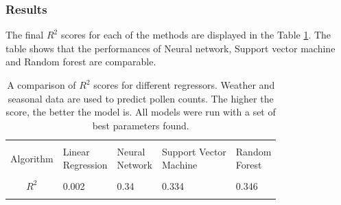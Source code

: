 \documentclass[a4paper,11pt]{article}
\begin{document}
\subsubsection*{Results}
The final $R^2$ scores for each of the methods are displayed in the Table \ref{tab:regressors}. The table shows that the performances of Neural network, Support vector machine and Random forest are comparable.\\
\begin{table}
	\centering
	\begin{tabular}{cllll}
		\hline \\
		\vspace{0.6em}
		Algorithm & \pbox{20cm}{Linear \\ Regression} & \pbox{20cm}{Neural \\ Network} & \pbox{20cm}{Support Vector \\ Machine}  &\pbox{20cm}{Random \\ Forest}  \\
		\hline \\
		\vspace{0.2em}
		$R^2$ & 0.002 & 0.34  & 0.334 & 0.346 \\ \vspace{-0.4em} \\
		\hline
	\end{tabular}
	\caption{A comparison of $R^2$ scores for different regressors. Weather and seasonal data are used to predict pollen counts. The higher the score, the better the model is. All models were run with a set of best parameters found.}
	\label{tab:regressors}
\end{table}
\end{document}
